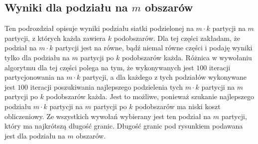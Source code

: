 \subsection{Wyniki dla podziału na $m$ obszarów}

Ten podrozdział opisuje wyniki podziału siatki podzielonej na $m \cdot k$ partycji na $m$ partycji, z których każda
zawiera $k$ podobszarów.
Dla tej części zakładam, że podział na $m \cdot k$ partycji jest na równe, bądź niemal równe części i podaję
wyniki tylko dla podziału na $m$ partycji po $k$ podobszarów każda.
Różnica w wywołaniu algorytmu dla tej części polega na tym, że wykonywanych jest $100$ iteracji
partycjonowania na $m \cdot k$ partycji, a dla każdego z tych podziałów wykonywane jest $100$ iteracji poszukiwania
najlepszego podzielenia tych $m \cdot k$ partycji na $m$ partycji po $k$ podobszarów każda.
Jest to możliwe, ponieważ szukanie najlepszego podziału $m \cdot k$ partycji na $m$ partycji po $k$ podobszarów
ma niski koszt obliczeniowy.
Ze wszystkich wywołań wybierany jest ten podział na $m$ partycji, który ma najkrótszą długość granic.
Długość granic pod rysunkiem podawana jest dla podziału na $m$ obszarów.

